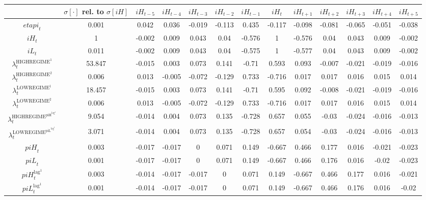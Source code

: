 \begin{tabular}{c|c|c|c|c|c|c|c|c|c|c|c|c|}
  & $\sigma[\cdot]$ rel. to $\sigma[{i\!H}]$ & ${i\!H}_{t-5}$ & ${i\!H}_{t-4}$ & ${i\!H}_{t-3}$ & ${i\!H}_{t-2}$ & ${i\!H}_{t-1}$ & ${i\!H}_{t}$ & ${i\!H}_{t+1}$ & ${i\!H}_{t+2}$ & ${i\!H}_{t+3}$ & ${i\!H}_{t+4}$ & ${i\!H}_{t+5}$\\
\hline
${e\!t\!a\!p\!i}_{t}$ & 0.001 & 0.042 & 0.036 & -0.019 & -0.113 & 0.435 & -0.117 & -0.098 & -0.081 & -0.065 & -0.051 & -0.038 \\
${i\!H}_{t}$ & 1 & -0.002 & 0.009 & 0.043 & 0.04 & -0.576 & 1 & -0.576 & 0.04 & 0.043 & 0.009 & -0.002 \\
${i\!L}_{t}$ & 0.011 & -0.002 & 0.009 & 0.043 & 0.04 & -0.575 & 1 & -0.577 & 0.04 & 0.043 & 0.009 & -0.002 \\
$\lambda^{\mathrm{HIGHREGIME}^{\mathrm{1}}}_{t}$ & 53.847 & -0.015 & 0.003 & 0.073 & 0.141 & -0.71 & 0.593 & 0.093 & -0.007 & -0.021 & -0.019 & -0.016 \\
$\lambda^{\mathrm{HIGHREGIME}^{\mathrm{2}}}_{t}$ & 0.006 & 0.013 & -0.005 & -0.072 & -0.129 & 0.733 & -0.716 & 0.017 & 0.017 & 0.016 & 0.015 & 0.014 \\
$\lambda^{\mathrm{LOWREGIME}^{\mathrm{1}}}_{t}$ & 18.457 & -0.015 & 0.003 & 0.073 & 0.141 & -0.71 & 0.595 & 0.092 & -0.008 & -0.021 & -0.019 & -0.016 \\
$\lambda^{\mathrm{LOWREGIME}^{\mathrm{2}}}_{t}$ & 0.006 & 0.013 & -0.005 & -0.072 & -0.129 & 0.733 & -0.716 & 0.017 & 0.017 & 0.016 & 0.015 & 0.014 \\
$\lambda^{\mathrm{HIGHREGIME}^{\mathrm{piH}^{\mathrm{lag}^{\mathrm{1}}}}}_{t}$ & 9.054 & -0.014 & 0.004 & 0.073 & 0.135 & -0.728 & 0.657 & 0.055 & -0.03 & -0.024 & -0.016 & -0.013 \\
$\lambda^{\mathrm{LOWREGIME}^{\mathrm{piL}^{\mathrm{lag}^{\mathrm{1}}}}}_{t}$ & 3.071 & -0.014 & 0.004 & 0.073 & 0.135 & -0.728 & 0.657 & 0.054 & -0.03 & -0.024 & -0.016 & -0.013 \\
${p\!i\!H}_{t}$ & 0.003 & -0.017 & -0.017 & 0 & 0.071 & 0.149 & -0.667 & 0.466 & 0.177 & 0.016 & -0.021 & -0.023 \\
${p\!i\!L}_{t}$ & 0.001 & -0.017 & -0.017 & 0 & 0.071 & 0.149 & -0.667 & 0.466 & 0.176 & 0.016 & -0.02 & -0.023 \\
${p\!i\!H}^{\mathrm{lag}^{\mathrm{1}}}_{t}$ & 0.003 & -0.014 & -0.017 & -0.017 & 0 & 0.071 & 0.149 & -0.667 & 0.466 & 0.177 & 0.016 & -0.021 \\
${p\!i\!L}^{\mathrm{lag}^{\mathrm{1}}}_{t}$ & 0.001 & -0.014 & -0.017 & -0.017 & 0 & 0.071 & 0.149 & -0.667 & 0.466 & 0.176 & 0.016 & -0.02 \\

\end{tabular}
